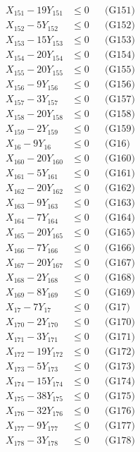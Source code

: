 \documentclass[a4paper,10pt]{article}
\begin{document}
{\begin{align}
X_{151} - 19Y_{151} &\leq 0 && \text{(G151)} \\
\allowbreak
X_{152} - 5Y_{152} &\leq 0 && \text{(G152)} \\
X_{153} - 15Y_{153} &\leq 0 && \text{(G153)} \\
X_{154} - 20Y_{154} &\leq 0 && \text{(G154)} \\
X_{155} - 20Y_{155} &\leq 0 && \text{(G155)} \\
X_{156} - 9Y_{156} &\leq 0 && \text{(G156)} \\
X_{157} - 3Y_{157} &\leq 0 && \text{(G157)} \\
X_{158} - 20Y_{158} &\leq 0 && \text{(G158)} \\
X_{159} - 2Y_{159} &\leq 0 && \text{(G159)} \\
X_{16} - 9Y_{16} &\leq 0 && \text{(G16)} \\
X_{160} - 20Y_{160} &\leq 0 && \text{(G160)} \\
X_{161} - 5Y_{161} &\leq 0 && \text{(G161)} \\
X_{162} - 20Y_{162} &\leq 0 && \text{(G162)} \\
X_{163} - 9Y_{163} &\leq 0 && \text{(G163)} \\
X_{164} - 7Y_{164} &\leq 0 && \text{(G164)} \\
X_{165} - 20Y_{165} &\leq 0 && \text{(G165)} \\
X_{166} - 7Y_{166} &\leq 0 && \text{(G166)} \\
X_{167} - 20Y_{167} &\leq 0 && \text{(G167)} \\
X_{168} - 2Y_{168} &\leq 0 && \text{(G168)} \\
X_{169} - 8Y_{169} &\leq 0 && \text{(G169)} \\
X_{17} - 7Y_{17} &\leq 0 && \text{(G17)} \\
\allowbreak
X_{170} - 2Y_{170} &\leq 0 && \text{(G170)} \\
X_{171} - 3Y_{171} &\leq 0 && \text{(G171)} \\
X_{172} - 19Y_{172} &\leq 0 && \text{(G172)} \\
X_{173} - 5Y_{173} &\leq 0 && \text{(G173)} \\
X_{174} - 15Y_{174} &\leq 0 && \text{(G174)} \\
X_{175} - 38Y_{175} &\leq 0 && \text{(G175)} \\
X_{176} - 32Y_{176} &\leq 0 && \text{(G176)} \\
X_{177} - 9Y_{177} &\leq 0 && \text{(G177)} \\
X_{178} - 3Y_{178} &\leq 0 && \text{(G178)} \\

\end{align}}
\end{document}
